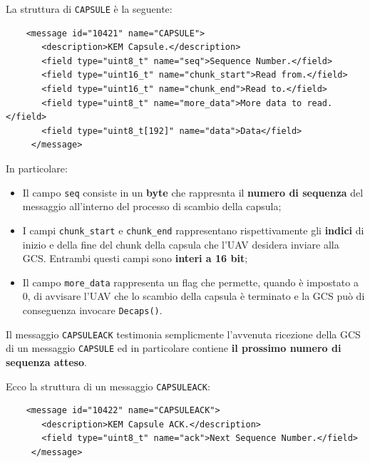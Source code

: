 \documentclass[a4paper, 12pt, oneside]{article}
\theoremstyle{definition}
\begin{document}
La struttura di \texttt{CAPSULE} è la seguente:

\begin{verbatim}
    <message id="10421" name="CAPSULE">
       <description>KEM Capsule.</description>
       <field type="uint8_t" name="seq">Sequence Number.</field>
       <field type="uint16_t" name="chunk_start">Read from.</field>
       <field type="uint16_t" name="chunk_end">Read to.</field>
       <field type="uint8_t" name="more_data">More data to read.</field>
       <field type="uint8_t[192]" name="data">Data</field>
     </message>
\end{verbatim}

In particolare:

\begin{itemize}
    \item Il campo \texttt{seq} consiste in un \textbf{byte} che rappresnta il \textbf{numero di sequenza} del messaggio all'interno del processo di scambio della capsula;
    \item I campi \texttt{chunk\_start} e \texttt{chunk\_end} rappresentano rispettivamente gli \textbf{indici} di inizio e della fine del chunk della capsula che l'UAV desidera inviare alla GCS. Entrambi questi campi sono \textbf{interi a 16 bit};
    \item Il campo \texttt{more\_data} rappresenta un flag che permette, quando è impostato a 0, di avvisare l'UAV che lo scambio della capsula è terminato e la GCS può di conseguenza invocare \texttt{Decaps()}.
\end{itemize}

Il messaggio \texttt{CAPSULEACK} testimonia semplicmente l'avvenuta ricezione della GCS di un messaggio \texttt{CAPSULE} ed in particolare contiene \textbf{il prossimo numero di sequenza atteso}.

Ecco la struttura di un messaggio \texttt{CAPSULEACK}:

\begin{verbatim}
    <message id="10422" name="CAPSULEACK">
       <description>KEM Capsule ACK.</description>
       <field type="uint8_t" name="ack">Next Sequence Number.</field>
     </message>
\end{verbatim}

\newpage
\end{document}
